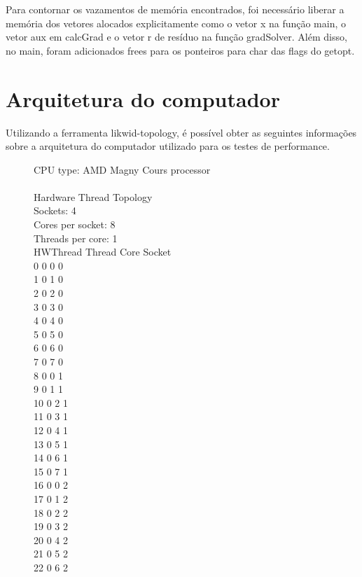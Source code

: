 \documentclass[12pt]{article}
\begin{document}
Para contornar os vazamentos de memória encontrados, foi necessário liberar a
memória dos vetores alocados explicitamente como o vetor x na função main, o
vetor aux em calcGrad e o vetor r de resíduo na função gradSolver. Além disso,
no main, foram adicionados frees para os ponteiros para char das flags do
getopt.

\section{Arquitetura do computador}\label{sec:likwid}

Utilizando a ferramenta likwid-topology, é possível obter as seguintes
informações sobre a arquitetura do computador utilizado para os testes de
performance.

\begin{figure}[ht]
\begin{tt}\noindent
CPU type:	AMD Magny Cours processor\\
\\
Hardware Thread Topology\\
Sockets:	4 \\
Cores per socket:	8 \\
Threads per core:	1 \\
HWThread	Thread		Core		Socket\\
0		0		0		0\\
1		0		1		0\\
2		0		2		0\\
3		0		3		0\\
4		0		4		0\\
5		0		5		0\\
6		0		6		0\\
7		0		7		0\\
8		0		0		1\\
9		0		1		1\\
10		0		2		1\\
11		0		3		1\\
12		0		4		1\\
13		0		5		1\\
14		0		6		1\\
15		0		7		1\\
16		0		0		2\\
17		0		1		2\\
18		0		2		2\\
19		0		3		2\\
20		0		4		2\\
21		0		5		2\\
22		0		6		2\\

\end{tt}
\end{figure}
\end{document}
